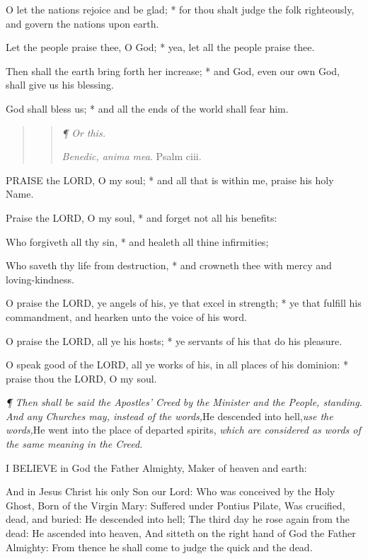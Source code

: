 O let the nations rejoice and be glad; * for thou shalt
judge the folk righteously, and govern the nations upon earth.

Let the people praise thee, O God; * yea, let all the
people praise thee.

Then shall the earth bring forth her increase; * and
God, even our own God, shall give us his blessing.

God shall bless us; * and all the ends of the world
shall fear him.

\begin{quote}

\begin{quote}

\emph{¶
Or this.}

\emph{Benedic,
anima mea}. Psalm ciii.

\end{quote}

\end{quote}

PRAISE
the LORD, O my soul; * and all that is within me,
praise his holy Name.

Praise the LORD, O my soul,
* and forget not all his benefits:

Who forgiveth all thy sin, * and healeth all thine
infirmities;

Who saveth thy life from destruction, * and crowneth
thee with mercy and loving-kindness.

O praise the LORD, ye angels
of his, ye that excel in strength; * ye that fulfill his commandment,
and hearken unto the voice of his word.

O praise the LORD, all ye his
hosts; * ye servants of his that do his pleasure.

O speak good of the LORD, all
ye works of his, in all places of his dominion: * praise thou the LORD,
O my soul.

\emph{¶
Then shall be said the Apostles’ Creed by the Minister and the People,
standing. And any Churches may, instead of the words,}He descended
into hell,\emph{use the words,}He went into the place of departed
spirits, \emph{which are considered as words of the same meaning in the
Creed.}

I
BELIEVE in God the Father Almighty, Maker of heaven and earth:

And in Jesus Christ his only Son our Lord: Who was
conceived by the Holy Ghost, Born of the Virgin Mary: Suffered under Pontius
Pilate, Was crucified, dead, and buried: He descended into hell; The third
day he rose again from the dead: He ascended into heaven, And sitteth
on the right hand of God the Father Almighty: From thence he shall come
to judge the quick and the dead. 

